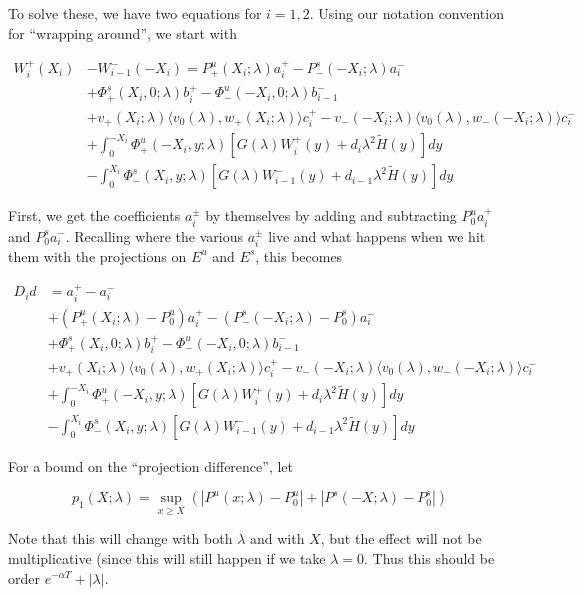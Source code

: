 \documentclass[12pt]{article}
\begin{document}
\begin{enumerate}
To solve these, we have two equations for $i = 1, 2$. Using our notation convention for ``wrapping around'', we start with

\begin{align*}
W_i^+(X_i) &- W_{i-1}^-(-X_i) = P^u_+(X_i; \lambda) a_i^+ - P^s_-(-X_i; \lambda) a_i^- \\
&+ \Phi^s_+(X_i, 0; \lambda)b_i^+ - \Phi^u_-(-X_i, 0; \lambda)b_{i-1}^- \\
&+ v_+(X_i; \lambda) \langle v_0(\lambda), w_+(X_i; \lambda) \rangle c_i^+ - v_-(-X_i; \lambda) \langle v_0(\lambda), w_-(-X_i; \lambda) \rangle c_i^- \\
&+ \int_0^{-X_i} \Phi^u_+(-X_i, y; \lambda) [ G(\lambda)W_i^+(y) + d_i \lambda^2 \tilde{H}(y) ] dy \\
&- \int_0^{X_i} \Phi^s_-(X_i, y; \lambda) [ G(\lambda)W_{i-1}^-(y) + d_{i-1} \lambda^2 \tilde{H}(y) ] dy
\end{align*}

First, we get the coefficients $a_i^\pm$ by themselves by adding and subtracting $P_0^u a_i^+$ and $P_0^s a_i^-$. Recalling where the various $a_i^\pm$ live and what happens when we hit them with the projections on $E^u$ and $E^s$, this becomes

\begin{align*}
D_i d &= a_i^+ - a_i^- \\
&+ (P^u_+(X_i; \lambda) - P_0^u)a_i^+ - (P^s_-(-X_i; \lambda) - P_0^s)a_i^- \\
&+ \Phi^s_+(X_i, 0; \lambda)b_i^+ - \Phi^u_-(-X_i, 0; \lambda)b_{i-1}^- \\
&+ v_+(X_i; \lambda) \langle v_0(\lambda), w_+(X_i; \lambda) \rangle c_i^+ - v_-(-X_i; \lambda) \langle v_0(\lambda), w_-(-X_i; \lambda) \rangle c_i^- \\
&+ \int_0^{-X_i} \Phi^u_+(-X_i, y; \lambda) [ G(\lambda)W_i^+(y) + d_i \lambda^2 \tilde{H}(y) ] dy \\
&- \int_0^{X_i} \Phi^s_-(X_i, y; \lambda) [ G(\lambda)W_{i-1}^-(y) + d_{i-1} \lambda^2 \tilde{H}(y) ] dy
\end{align*}

For a bound on the ``projection difference'', let

\[
p_1(X;\lambda) = \sup_{x \geq X} (|P^u(x;\lambda) - P_0^u| + |P^s(-X;\lambda) - P_0^s|)
\]

Note that this will change with both $\lambda$ and with $X$, but the effect will not be multiplicative (since this will still happen if we take $\lambda = 0$. Thus this should be order $e^{-\alpha T} + |\lambda|$. \\


\end{enumerate}
\end{document}

